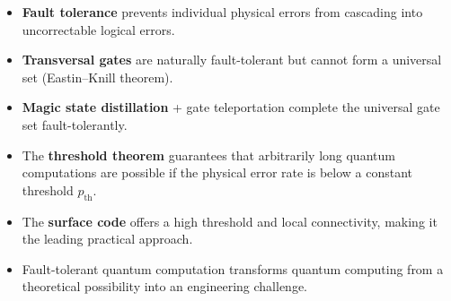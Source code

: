 \documentclass[11pt]{article}
\theoremstyle{definition}
\begin{document}
\begin{itemize}
    \item \textbf{Fault tolerance} prevents individual physical errors from cascading into uncorrectable logical errors.
    \item \textbf{Transversal gates} are naturally fault-tolerant but cannot form a universal set (Eastin--Knill theorem).
    \item \textbf{Magic state distillation} + gate teleportation complete the universal gate set fault-tolerantly.
    \item The \textbf{threshold theorem} guarantees that arbitrarily long quantum computations are possible if the physical error rate is below a constant threshold $p_{\mathrm{th}}$.
    \item The \textbf{surface code} offers a high threshold and local connectivity, making it the leading practical approach.
    \item Fault-tolerant quantum computation transforms quantum computing from a theoretical possibility into an engineering challenge.
\end{itemize}
\end{document}

